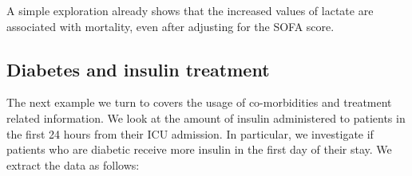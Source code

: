 \documentclass[
]{jss}
\begin{document}
A simple exploration already shows that the increased values of lactate
are associated with mortality, even after adjusting for the SOFA score.

\hypertarget{diabetes-and-insulin-treatment}{%
\subsection{Diabetes and insulin
treatment}\label{diabetes-and-insulin-treatment}}

The next example we turn to covers the usage of co-morbidities and
treatment related information. We look at the amount of insulin
administered to patients in the first 24 hours from their ICU admission.
In particular, we investigate if patients who are diabetic receive more
insulin in the first day of their stay. We extract the data as follows:
\end{document}
